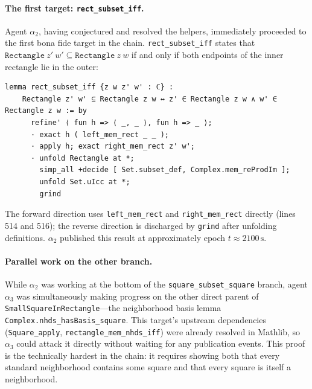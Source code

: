 \paragraph{The first target: \texttt{rect\_subset\_iff}.}
Agent $\alpha_2$, having conjectured and resolved the helpers, immediately proceeded to the first bona fide target in the chain. \texttt{rect\_subset\_iff} states that $\texttt{Rectangle}\ z'\ w' \subseteq \texttt{Rectangle}\ z\ w$ if and only if both endpoints of the inner rectangle lie in the outer:
 
\begin{lstlisting}[caption={\texttt{rect\_subset\_iff}, resolved by $\alpha_2$ (lines 511--520).},label={lst:rectsubsetiff}]
lemma rect_subset_iff {z w z' w' : ℂ} :
    Rectangle z' w' ⊆ Rectangle z w ↔ z' ∈ Rectangle z w ∧ w' ∈ Rectangle z w := by
      refine' ⟨ fun h => ⟨ _, _ ⟩, fun h => _ ⟩;
      · exact h ( left_mem_rect _ _ );
      · apply h; exact right_mem_rect z' w';
      · unfold Rectangle at *;
        simp_all +decide [ Set.subset_def, Complex.mem_reProdIm ];
        unfold Set.uIcc at *;
        grind
\end{lstlisting}
 
The forward direction uses \texttt{left\_mem\_rect} and \texttt{right\_mem\_rect} directly (lines 514 and 516); the reverse direction is discharged by \texttt{grind} after unfolding definitions. $\alpha_2$ published this result at approximately epoch $t\!\approx\!2100\,\mathrm{s}$.
 
\paragraph{Parallel work on the other branch.}
While $\alpha_2$ was working at the bottom of the \texttt{square\_subset\_square} branch, agent $\alpha_3$ was simultaneously making progress on the other direct parent of \texttt{SmallSquareInRectangle}---the neighborhood basis lemma \texttt{Complex.nhds\_hasBasis\_square}. This target's upstream dependencies (\texttt{Square\_apply}, \texttt{rectangle\_mem\_nhds\_iff}) were already resolved in Mathlib, so $\alpha_3$ could attack it directly without waiting for any publication events. This proof is the technically hardest in the chain: it requires showing both that every standard neighborhood contains some square and that every square is itself a neighborhood.
 
